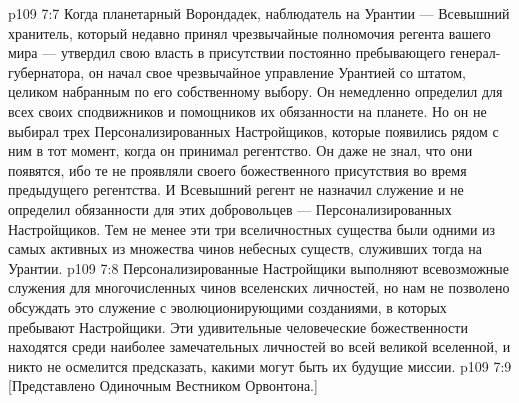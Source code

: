 \vs p109 7:7 \pc Когда планетарный Ворондадек, наблюдатель на Урантии --- Всевышний хранитель, который недавно принял чрезвычайные полномочия регента вашего мира --- утвердил свою власть в присутствии постоянно пребывающего генерал\hyp{}губернатора, он начал свое чрезвычайное управление Урантией со штатом, целиком набранным по его собственному выбору. Он немедленно определил для всех своих сподвижников и помощников их обязанности на планете. Но он не выбирал трех Персонализированных Настройщиков, которые появились рядом с ним в тот момент, когда он принимал регентство. Он даже не знал, что они появятся, ибо те не проявляли своего божественного присутствия во время предыдущего регентства. И Всевышний регент не назначил служение и не определил обязанности для этих добровольцев --- Персонализированных Настройщиков. Тем не менее эти три вселичностных существа были одними из самых активных из множества чинов небесных существ, служивших тогда на Урантии.
\vs p109 7:8 \pc Персонализированные Настройщики выполняют всевозможные служения для многочисленных чинов вселенских личностей, но нам не позволено обсуждать это служение с эволюционирующими созданиями, в которых пребывают Настройщики. Эти удивительные человеческие божественности находятся среди наиболее замечательных личностей во всей великой вселенной, и никто не осмелится предсказать, какими могут быть их будущие миссии.
\vsetoff
\vs p109 7:9 [Представлено Одиночным Вестником Орвонтона.]
